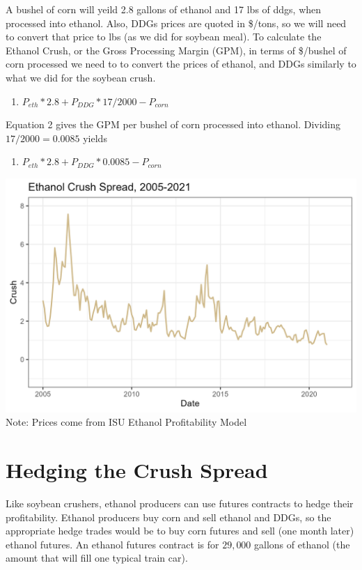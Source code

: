 \documentclass[
  letterpaper,
  DIV=11,
  numbers=noendperiod]{scrreprt}
\providecommand{\tightlist}{%
  \setlength{\itemsep}{0pt}\setlength{\parskip}{0pt}}\usepackage{longtable,booktabs,array}
\begin{document}
A bushel of corn will yeild 2.8 gallons of ethanol and 17 lbs of ddgs,
when processed into ethanol. Also, DDGs prices are quoted in \$/tons, so
we will need to convert that price to lbs (as we did for soybean meal).
To calculate the Ethanol Crush, or the Gross Processing Margin (GPM), in
terms of \$/bushel of corn processed we need to to convert the prices of
ethanol, and DDGs similarly to what we did for the soybean crush.

\begin{enumerate}
\def\labelenumi{\arabic{enumi}.}
\setcounter{enumi}{1}
\tightlist
\item
  \(P_{eth}*2.8 + P_{DDG}*17/2000 - P_{corn}\)
\end{enumerate}

Equation 2 gives the GPM per bushel of corn processed into ethanol.
Dividing \(17/2000 = 0.0085\) yields

\begin{enumerate}
\def\labelenumi{\arabic{enumi}.}
\setcounter{enumi}{2}
\tightlist
\item
  \(P_{eth}*2.8 + P_{DDG}*0.0085 - P_{corn}\)
\end{enumerate}

\includegraphics{assets/ECrushSpread.png} Note: Prices come from ISU
Ethanol Profitability Model

\hypertarget{hedging-the-crush-spread}{%
\section{Hedging the Crush Spread}\label{hedging-the-crush-spread}}

Like soybean crushers, ethanol producers can use futures contracts to
hedge their profitability. Ethanol producers buy corn and sell ethanol
and DDGs, so the appropriate hedge trades would be to buy corn futures
and sell (one month later) ethanol futures. An ethanol futures contract
is for \(29,000\) gallons of ethanol (the amount that will fill one
typical train car).
\end{document}
